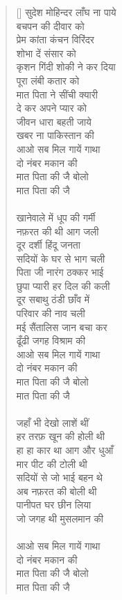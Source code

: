 \begin{verse}[\versewidth]
{सुदेश मोहिन्दर लाँघ ना पाये\\
बचपन की दीवार को\\
प्रेम कांता कंचन विरिंदर\\
शोभा दें संसार को\\
कृशन गिंदी शोकी ने कर दिया\\
पूरा लंबी कतार को\\
मात पिता ने सींची क्यारी\\
दे कर अपने प्यार को\\
जीवन धारा बहती जाये\\
खबर ना पाकिस्तान की\\
आओ सब मिल गायें गाथा\\
दो नंबर मकान की\\
मात पिता की जै बोलो\\
मात पिता की जै\\
\\
खानेवाले में धूप की गर्मी\\
नफ़रत की थी आग जली\\
दूर दर्शी हिंदू जनता\\
सदियों के घर से भाग चली\\
पिता जी नारंग ठक्कर भाई\\
छुपा प्यारी हर दिल की कली\\
दूर सबाथु ठंडी छाँव में\\
परिवार की नाव चली\\
मई सैंतालिस जान बचा कर\\
ढूँढी जगह विश्राम की\\
आओ सब मिल गायें गाथा\\
दो नंबर मकान की\\
मात पिता की जै बोलो\\
मात पिता की जै\\
\\
जहाँ भी देखो लाशें थीं\\
हर तरफ़ खून की होली थी\\
हा हा कार था आग और धुआँ\\
मार पीट की टोली थी\\
सदियों से जो भाई बहन थे\\
अब नफ़रत की बोली थी\\
पानीपत घर छीन लिया\\
जो जगह थी मुसलमान की\\
\\
आओ सब मिल गायें गाथा\\
दो नंबर मकान की\\
मात पिता की जै बोलो\\
मात पिता की जै\\
}
\end{verse}
